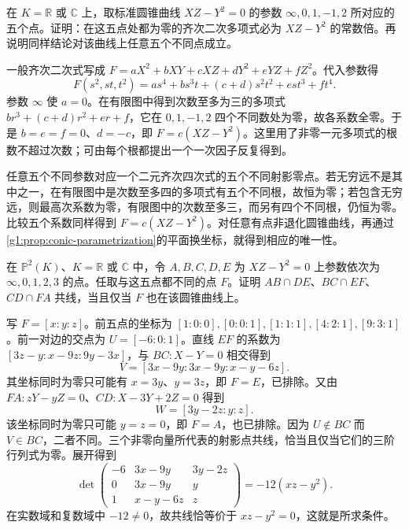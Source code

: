 \begin{exercise}\label{g1:ex:five-conic-points}
	在 \(K=\mathbb R\) 或 \(\mathbb C\) 上，取标准圆锥曲线 \(XZ-Y^2=0\) 的参数 \(\infty,0,1,-1,2\) 所对应的五个点。证明：在这五点处都为零的齐次二次多项式必为 \(XZ-Y^2\) 的常数倍。再说明同样结论对该曲线上任意五个不同点成立。
\end{exercise}
\begin{solution}
	一般齐次二次式写成 \(F=aX^2+bXY+cXZ+dY^2+eYZ+fZ^2\)。代入参数得
	\[
		F(s^2,st,t^2)=as^4+bs^3t+(c+d)s^2t^2+est^3+ft^4.
	\]
	参数 \(\infty\) 使 \(a=0\)。在有限图中得到次数至多为三的多项式 \(br^3+(c+d)r^2+er+f\)，它在 \(0,1,-1,2\) 四个不同数处为零，故各系数全零。于是 \(b=e=f=0\)、\(d=-c\)，即 \(F=c(XZ-Y^2)\)。这里用了非零一元多项式的根数不超过次数；可由每个根都提出一个一次因子反复得到。

	任意五个不同参数对应一个二元齐次四次式的五个不同射影零点。若无穷远不是其中之一，在有限图中是次数至多四的多项式有五个不同根，故恒为零；若包含无穷远，则最高次系数为零，有限图中的次数至多三，而另有四个不同根，仍恒为零。比较五个系数同样得到 \(F=c(XZ-Y^2)\)。对任意有点非退化圆锥曲线，再通过\cref{g1:prop:conic-parametrization}的平面换坐标，就得到相应的唯一性。
\end{solution}

\begin{exercise}\label{g1:ex:pascal-converse}
	在 \(\mathbb P^2(K)\)、\(K=\mathbb R\) 或 \(\mathbb C\) 中，令 \(A,B,C,D,E\) 为 \(XZ-Y^2=0\) 上参数依次为 \(\infty,0,1,2,3\) 的点。任取与这五点都不同的点 \(F\)。证明 \(AB\cap DE\)、\(BC\cap EF\)、\(CD\cap FA\) 共线，当且仅当 \(F\) 也在该圆锥曲线上。
\end{exercise}
\begin{solution}
	写 \(F=[x:y:z]\)。前五点的坐标为 \([1:0:0],[0:0:1],[1:1:1],[4:2:1],[9:3:1]\)。前一对边的交点为 \(U=[-6:0:1]\)。直线 \(EF\) 的系数为 \([3z-y:x-9z:9y-3x]\)，与 \(BC:X-Y=0\) 相交得到
	\[
		V=[3x-9y:3x-9y:x-y-6z].
	\]
	其坐标同时为零只可能有 \(x=3y\)、\(y=3z\)，即 \(F=E\)，已排除。又由 \(FA:zY-yZ=0\)、\(CD:X-3Y+2Z=0\) 得到
	\[
		W=[3y-2z:y:z].
	\]
	该坐标同时为零只可能 \(y=z=0\)，即 \(F=A\)，也已排除。因为 \(U\notin BC\) 而 \(V\in BC\)，二者不同。三个非零向量所代表的射影点共线，恰当且仅当它们的三阶行列式为零。展开得到
	\[
		\det\begin{pmatrix}
			-6&3x-9y&3y-2z\\
			0&3x-9y&y\\
			1&x-y-6z&z
		\end{pmatrix}
		=-12(xz-y^2).
	\]
	在实数域和复数域中 \(-12\ne0\)，故共线恰等价于 \(xz-y^2=0\)，这就是所求条件。
\end{solution}

